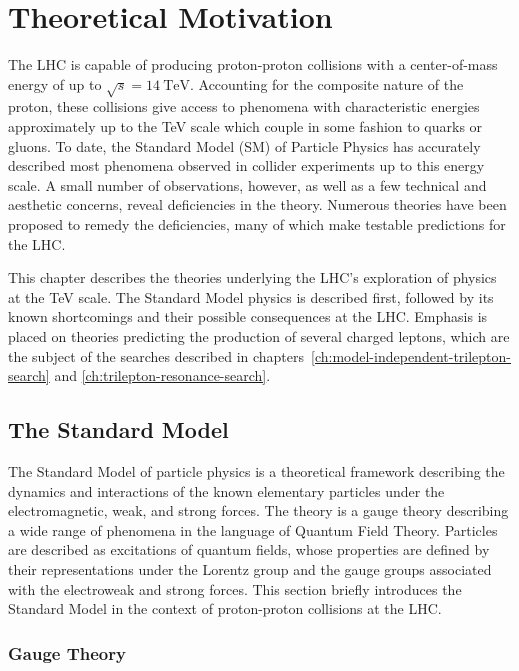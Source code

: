 \chapter{Theoretical Motivation}\label{ch:theory}

The LHC is capable of producing proton-proton collisions with a center-of-mass energy of up to $\sqrt{s}=14~\mbox{TeV}$. Accounting for the composite nature of the proton, these collisions give access to phenomena with characteristic energies approximately up to the TeV scale which couple in some fashion to quarks or gluons. To date, the Standard Model (SM) of Particle Physics has accurately described most phenomena observed in collider experiments up to this energy scale. A small number of observations, however, as well as a few technical and aesthetic concerns, reveal deficiencies in the theory. Numerous theories have been proposed to remedy the deficiencies, many of which make testable predictions for the LHC.

This chapter describes the theories underlying the LHC's exploration of physics at the TeV scale. The Standard Model physics is described first, followed by its known shortcomings and their possible consequences at the LHC. Emphasis is placed on theories predicting the production of several charged leptons, which are the subject of the searches described in chapters~\ref{ch:model-independent-trilepton-search} and \ref{ch:trilepton-resonance-search}.


\section{The Standard Model}\label{sec:standard-model}
The Standard Model of particle physics is a theoretical framework describing the dynamics and interactions of the known elementary particles under the electromagnetic, weak, and strong forces. The theory is a gauge theory describing a wide range of phenomena in the language of Quantum Field Theory. Particles are described as excitations of quantum fields, whose properties are defined by their representations under the Lorentz group and the gauge groups associated with the electroweak and strong forces. This section briefly introduces the Standard Model in the context of proton-proton collisions at the LHC.


\subsection{Gauge Theory}\label{sec:gauge-theory}

